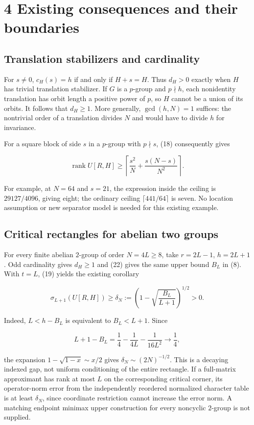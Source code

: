 \documentclass[
  11pt,
  letterpaper,
]{article}
\begin{document}
\section{4 Existing consequences and their
boundaries}\label{existing-consequences-and-their-boundaries}

\subsection{Translation stabilizers and
cardinality}\label{translation-stabilizers-and-cardinality}

For \(s\neq0\), \(c_H(s)=h\) if and only if \(H+s=H\). Thus \(d_H>0\)
exactly when \(H\) has trivial translation stabilizer. If \(G\) is a
\(p\)-group and \(p\nmid h\), each nonidentity translation has orbit
length a positive power of \(p\), so \(H\) cannot be a union of its
orbits. It follows that \(d_H\geq1\). More generally, \(\gcd(h,N)=1\)
suffices: the nontrivial order of a translation divides \(N\) and would
have to divide \(h\) for invariance.

For a square block of side \(s\) in a \(p\)-group with \(p\nmid s\),
(18) consequently gives

\[
\operatorname{rank}U[R,H]\geq
\left\lceil\frac{s^2}N+\frac{s(N-s)}{N^2}\right\rceil.        \tag{23}
\]

For example, at \(N=64\) and \(s=21\), the expression inside the ceiling
is \(29127/4096\), giving eight; the ordinary ceiling
\(\lceil441/64\rceil\) is seven. No location assumption or new separator
model is needed for this existing example.

\subsection{Critical rectangles for abelian two
groups}\label{critical-rectangles-for-abelian-two-groups}

For every finite abelian \(2\)-group of order \(N=4L\geq8\), take
\(r=2L-1\), \(h=2L+1\). Odd cardinality gives \(d_H\geq1\) and (22)
gives the same upper bound \(B_L\) in (8). With \(t=L\), (19) yields the
existing corollary

\[
\sigma_{L+1}(U[R,H])\geq
\delta_N:=\left(1-\sqrt{\frac{B_L}{L+1}}\right)^{1/2}>0.      \tag{24}
\]

Indeed, \(L<h-B_L\) is equivalent to \(B_L<L+1\). Since

\[
L+1-B_L=\frac14-\frac1{4L}-\frac1{16L^2}\longrightarrow\frac14,
\]

the expansion \(1-\sqrt{1-x}\sim x/2\) gives
\(\delta_N\sim(2N)^{-1/2}\). This is a decaying indexed gap, not uniform
conditioning of the entire rectangle. If a full-matrix approximant has
rank at most \(L\) on the corresponding critical corner, its
operator-norm error from the independently reordered normalized
character table is at least \(\delta_N\), since coordinate restriction
cannot increase the error norm. A matching endpoint minimax upper
construction for every noncyclic \(2\)-group is not supplied.
\end{document}

